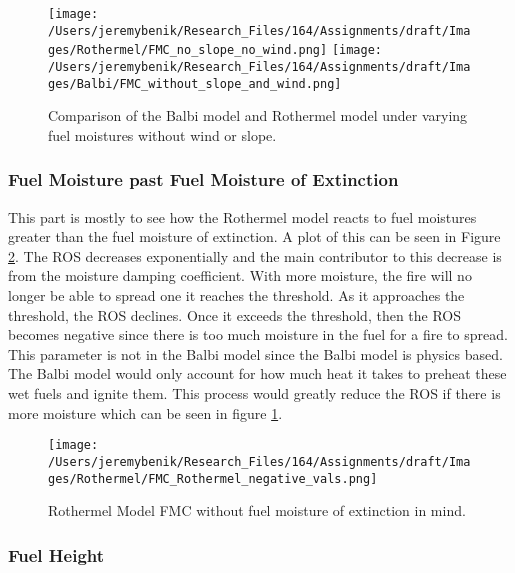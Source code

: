 \documentclass{article}
\begin{document}
\begin{figure}[!h]
\centering
  \texttt{[image: /Users/jeremybenik/Research\_Files/164/Assignments/draft/Images/Rothermel/FMC\_no\_slope\_no\_wind.png]}
  \texttt{[image: /Users/jeremybenik/Research\_Files/164/Assignments/draft/Images/Balbi/FMC\_without\_slope\_and\_wind.png]}
  \caption{Comparison of the Balbi model and Rothermel model under varying fuel moistures without wind or slope.}
  \label{balbi_vs_rother_fmc_no_wind_no_slope}
\end{figure}

\subsubsection*{Fuel Moisture past Fuel Moisture of Extinction}
\indent This part is mostly to see how the Rothermel model reacts to fuel moistures greater than the fuel moisture of extinction. A plot of this can be seen in Figure \ref{rothermel_neg}. The ROS decreases exponentially and the main contributor to this decrease is from the moisture damping coefficient. With more moisture, the fire will no longer be able to spread one it reaches the threshold. As it approaches the threshold, the ROS declines. Once it exceeds the threshold, then the ROS becomes negative since there is too much moisture in the fuel for a fire to spread. This parameter is not in the Balbi model since the Balbi model is physics based. The Balbi model would only account for how much heat it takes to preheat these wet fuels and ignite them. This process would greatly reduce the ROS if there is more moisture which can be seen in figure \ref{balbi_vs_rother_fmc_no_wind_no_slope}.

\begin{figure}[!h]
\centering
  \texttt{[image: /Users/jeremybenik/Research\_Files/164/Assignments/draft/Images/Rothermel/FMC\_Rothermel\_negative\_vals.png]}
  \caption{Rothermel Model FMC without fuel moisture of extinction in mind.}
  \label{rothermel_neg}
\end{figure}

\subsubsection{Fuel Height}
\end{document}
